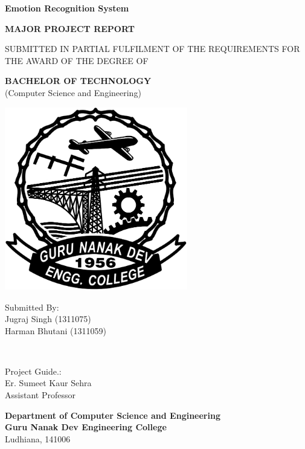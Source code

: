 \begin{titlepage}
	\centering
	\fontsize{24}{0}\textbf{Emotion Recognition System}
	
	\vskip 1.5cm
	\fontsize{14}{0}\textbf{MAJOR PROJECT REPORT}
	
	\vskip 1.5cm
	\fontsize{12}{0}
	\textnormal{
	SUBMITTED IN PARTIAL FULFILMENT OF THE REQUIREMENTS FOR THE AWARD OF THE DEGREE OF}

	\vskip 1.5cm
	\fontsize{14}{0}\textbf{BACHELOR OF TECHNOLOGY}\\
	\textnormal{(Computer Science and Engineering)}
	
	\vskip 1.5cm
	\includegraphics[width=8cm, height=8cm]{images/gndec_black.png}
	
	\vskip 1.5cm
	\fontsize{14}{0}
	\begin{minipage}{0.6\textwidth}
		\begin{flushleft}
			\textnormal{Submitted By:\\
			\vskip 0.25cm
			Jugraj Singh (1311075)\\
			\vskip 0.25cm
			Harman Bhutani (1311059)}
		\end{flushleft}
	\end{minipage}
	~
	\begin{minipage}{0.35\textwidth}
		\begin{flushright}
			\textnormal{ Project Guide.:\\
			\vskip 0.25cm
			Er. Sumeet Kaur Sehra\\
			\vskip 0.25cm
			Assistant Professor}
		\end{flushright}
	\end{minipage}

	\vskip 1.75cm
	\fontsize{14}{0}\textbf{Department of Computer Science and Engineering\\Guru Nanak Dev Engineering College}
	\textnormal{\\Ludhiana, 141006}
\end{titlepage}